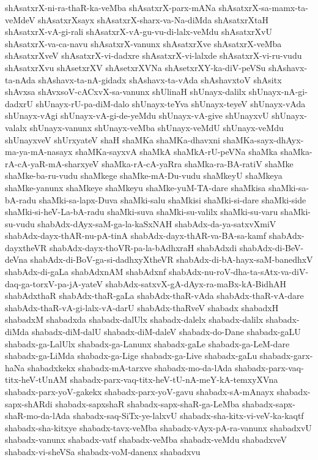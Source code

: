 {shAsatxrX-ni-ra-thaR-ka-veMba
shAsatxrX-parx-mANa
shAsatxrX-sa-mamx-ta-veMdeV
shAsatxrXsayx
shAsatxrX-sharx-va-Na-diMda
shAsatxrXtaH
shAsatxrX-vA-gi-rali
shAsatxrX-vA-gu-vu-di-lalx-veMdu
shAsatxrXvU
shAsatxrX-va-ca-navu
shAsatxrX-vanunx
shAsatxrXve
shAsatxrX-veMba
shAsatxrXveV
shAsatxrX-vi-dadxre
shAsatxrX-vi-lalxde
shAsatxrX-vi-ru-vudu
shAsatxrXvu
shAsetxrXV
shAsetxrXVNa
shAsetxrXY-ka-diV-peVSu
shAshavx-ta-nAda
shAshavx-ta-nA-gidadx
shAshavx-ta-vAda
shAshavxtoV
shAsitx
shAvxsa
shAvxsoV-cACxvX-sa-vanunx
shUlinaH
shUnayx-dalilx
shUnayx-nA-gi-dadxrU
shUnayx-rU-pa-diM-dalo
shUnayx-teYva
shUnayx-teyeV
shUnayx-vAda
shUnayx-vAgi
shUnayx-vA-gi-de-yeMdu
shUnayx-vA-give
shUnayxvU
shUnayx-valalx
shUnayx-vanunx
shUnayx-veMba
shUnayx-veMdU
shUnayx-veMdu
shUnayxveV
shUrxyateV
shaH
shaMKa
shaMKa-dhavxni
shaMKa-sayx-dhAyx-ma-ya-mA-nasayx
shaMKa-sayxvA
shaMkA
shaMkA-rU-peVNa
shaMka
shaMka-rA-cA-yaR-mA-sharxyeV
shaMka-rA-cA-yaRra
shaMka-ra-BA-ratiV
shaMke
shaMke-ba-ru-vudu
shaMkege
shaMke-mA-Du-vudu
shaMkeyU
shaMkeya
shaMke-yanunx
shaMkeye
shaMkeyu
shaMke-yuM-TA-dare
shaMkisa
shaMki-sa-bA-radu
shaMki-sa-lapx-Duva
shaMki-salu
shaMkisi
shaMki-si-dare
shaMki-side
shaMki-si-heV-La-bA-radu
shaMki-suva
shaMki-su-valilx
shaMki-su-varu
shaMki-su-vudu
shabAdx-dAyx-saM-ga-la-kaSxNAH
shabAdx-da-ya-satxvXmiV
shabAdx-dayx-thAR-nu-pA-tinA
shabAdx-dayx-thAR-va-BA-sa-kamf
shabAdx-dayxtheVR
shabAdx-dayx-thoVR-pa-la-bAdhxraH
shabAdxdi
shabAdx-di-BeV-deVna
shabAdx-di-BoV-ga-si-dadhxyXtheVR
shabAdx-di-bA-hayx-saM-banedhxV
shabAdx-di-gaLa
shabAdxnAM
shabAdxnf
shabAdx-nu-roV-dha-ta-sAtx-va-diV-daq-ga-torxV-pa-jA-yateV
shabAdx-satxvX-gA-dAyx-ra-maBx-kA-BidhAH
shabAdxthaR
shabAdx-thaR-gaLa
shabAdx-thaR-vAda
shabAdx-thaR-vA-dare
shabAdx-thaR-vA-gi-lalx-vA-darU
shabAdx-thaRveV
shabadx
shabadxH
shabadxM
shabadxda
shabadx-dalUlx
shabadx-dalelx
shabadx-dalilx
shabadx-diMda
shabadx-diM-dalU
shabadx-diM-daleV
shabadx-do-Dane
shabadx-gaLU
shabadx-ga-LalUlx
shabadx-ga-Lanunx
shabadx-gaLe
shabadx-ga-LeM-dare
shabadx-ga-LiMda
shabadx-ga-Lige
shabadx-ga-Live
shabadx-gaLu
shabadx-garx-haNa
shabadxkekx
shabadx-mA-tarxve
shabadx-mo-da-lAda
shabadx-parx-vaq-titx-heV-tUnAM
shabadx-parx-vaq-titx-heV-tU-nA-meY-kA-temxyXVna
shabadx-parx-yoV-gakekx
shabadx-parx-yoV-gavu
shabadx-sA-mAnayx
shabadx-sapx-shARdi
shabadx-sapxshaR
shabadx-sapx-shaR-ga-LeMba
shabadx-sapx-shaR-mo-da-lAda
shabadx-saq-SiTx-ye-lalxvU
shabadx-sha-kitx-vi-veV-ka-kaqtf
shabadx-sha-kitxye
shabadx-tavx-veMba
shabadx-vAyx-pA-ra-vanunx
shabadxvU
shabadx-vanunx
shabadx-vatf
shabadx-veMba
shabadx-veMdu
shabadxveV
shabadx-vi-sheVSa
shabadx-voM-danenx
shabadxvu
}
